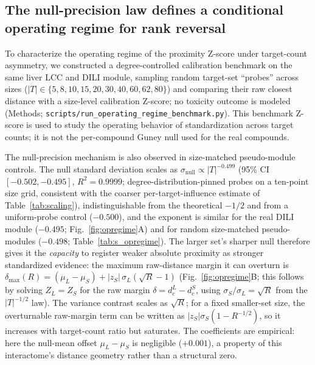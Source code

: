 \subsection{The null-precision law defines a conditional operating regime for rank reversal}
\label{subsec:opregime}

To characterize the operating regime of the proximity Z-score under target-count asymmetry, we constructed a degree-controlled calibration benchmark on the same liver LCC and DILI module, sampling random target-set ``probes'' across sizes ($|T| \in \{5,8,10,15,20,30,40,60,62,80\}$) and comparing their raw closest distance with a size-level calibration Z-score; no toxicity outcome is modeled (Methods; \texttt{scripts/run\_operating\_regime\_benchmark.py}). This benchmark Z-score is used to study the operating behavior of standardization across target counts; it is not the per-compound Guney null used for the real compounds.

The null-precision mechanism is also observed in size-matched pseudo-module controls. The null standard deviation scales as $\sigma_{\text{null}} \propto |T|^{-0.499}$ (95\% CI $[-0.502,-0.495]$, $R^2=0.9999$; degree-distribution-pinned probes on a ten-point size grid, consistent with the coarser per-target-influence estimate of Table~\ref{tab:scaling}), indistinguishable from the theoretical $-1/2$ and from a uniform-probe control ($-0.500$), and the exponent is similar for the real DILI module ($-0.495$; Fig.~\ref{fig:opregime}A) and for random size-matched pseudo-modules ($-0.498$; Table~\ref{tab:s_opregime}). The larger set's sharper null therefore gives it the \emph{capacity} to register weaker absolute proximity as stronger standardized evidence: the maximum raw-distance margin it can overturn is $\delta_{\max}(R) = (\mu_L-\mu_S) + |z_S|\,\sigma_L(\sqrt{R}-1)$ (Fig.~\ref{fig:opregime}B; this follows by solving $Z_L = Z_S$ for the raw margin $\delta = d_c^L - d_c^S$, using $\sigma_S/\sigma_L = \sqrt{R}$ from the $|T|^{-1/2}$ law). The variance contrast scales as $\sqrt{R}$; for a fixed smaller-set size, the overturnable raw-margin term can be written as $|z_S|\sigma_S(1-R^{-1/2})$, so it increases with target-count ratio but saturates. The coefficients are empirical: here the null-mean offset $\mu_L-\mu_S$ is negligible ($+0.001$), a property of this interactome's distance geometry rather than a structural zero.

